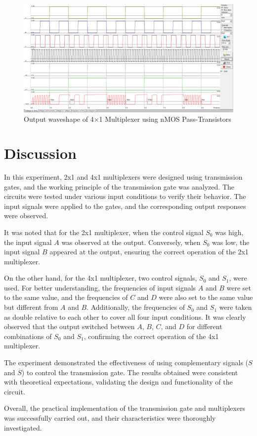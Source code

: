 \documentclass[a4paper,12pt]{article}
\begin{document}
		\begin{figure}[H]
		\centering
		\includegraphics[width=1\linewidth, height=.4\textheight]{Images/5}
		\caption{Output waveshape of 4$\times$1 Multiplexer using nMOS Pass-Transistors}
		\label{fig:1}
	\end{figure}
	
	\section{Discussion }
	In this experiment, 2x1 and 4x1 multiplexers were designed using transmission gates, and the working principle of the transmission gate was analyzed. The circuits were tested under various input conditions to verify their behavior. The input signals were applied to the gates, and the corresponding output responses were observed.
	
	It was noted that for the 2x1 multiplexer, when the control signal \(S_0\) was high, the input signal \(A\) was observed at the output. Conversely, when \(S_0\) was low, the input signal \(B\) appeared at the output, ensuring the correct operation of the 2x1 multiplexer.
	
	On the other hand, for the 4x1 multiplexer, two control signals, \(S_0\) and \(S_1\), were used. For better understanding, the frequencies of input signals \(A\) and \(B\) were set to the same value, and the frequencies of \(C\) and \(D\) were also set to the same value but different from \(A\) and \(B\). Additionally, the frequencies of \(S_0\) and \(S_1\) were taken as double relative to each other to cover all four input conditions. It was clearly observed that the output switched between \(A\), \(B\), \(C\), and \(D\) for different combinations of \(S_0\) and \(S_1\), confirming the correct operation of the 4x1 multiplexer.
	
	The experiment demonstrated the effectiveness of using complementary signals (\(S\) and \(\overline{S}\)) to control the transmission gate. The results obtained were consistent with theoretical expectations, validating the design and functionality of the circuit.
	
	Overall, the practical implementation of the transmission gate and multiplexers was successfully carried out, and their characteristics were thoroughly investigated.
	
	
\end{document}
